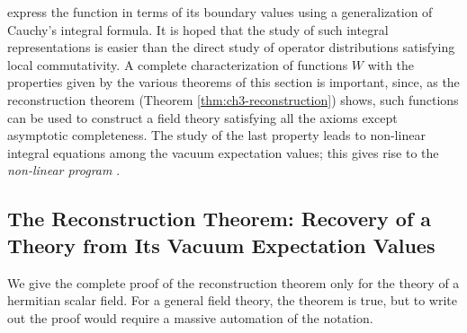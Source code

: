 express the function in terms of its boundary values using a generalization of
Cauchy's integral formula. It is hoped that the study of such integral
representations is easier than the direct study of operator distributions
satisfying local commutativity. A complete characterization of functions $W$
with the properties given by the various theorems of this section is important,
since, as the reconstruction theorem (Theorem \ref{thm:ch3-reconstruction}) shows, such functions can
be used to construct a field theory satisfying all the axioms except asymptotic
completeness. The study of the last property leads to non-linear integral
equations among the vacuum expectation values; this gives rise to the
\emph{non-linear program} \cite{pct-ch3-16}.

\begingroup
\setlength{\emergencystretch}{3em}
\subsection{The Reconstruction Theorem: Recovery of a Theory from Its Vacuum Expectation Values}
\label{sec:ch3-reconstruction}
\endgroup

We give the complete proof of the reconstruction theorem only for the theory
of a hermitian scalar field.  For a general field theory, the theorem is true,
but to write out the proof would require a massive automation of the notation.

